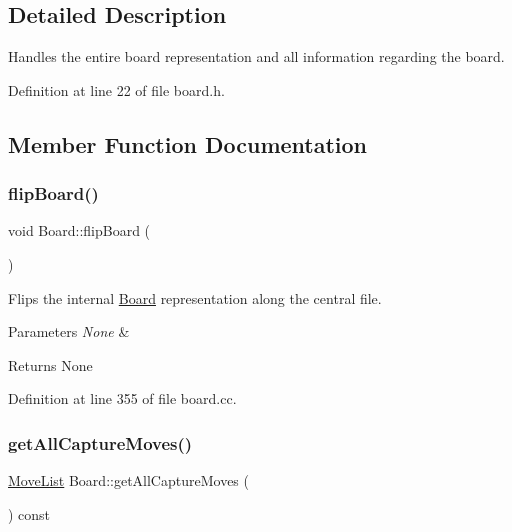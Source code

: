 \subsection{Detailed Description}
Handles the entire board representation and all information regarding the board. 

Definition at line 22 of file board.\+h.



\subsection{Member Function Documentation}
\mbox{\label{classBoard_a6007b1cc2025e26a23e63621f36fee19}} 
\subsubsection{\texorpdfstring{flip\+Board()}{flipBoard()}}
{\footnotesize\ttfamily void Board\+::flip\+Board (\begin{DoxyParamCaption}{ }\end{DoxyParamCaption})\hspace{0.3cm}{\ttfamily [noexcept]}}



Flips the internal \mbox{\hyperlink{classBoard}{Board}} representation along the central file. 


\begin{DoxyParams}{Parameters}
{\em None} & \\
\hline
\end{DoxyParams}
\begin{DoxyReturn}{Returns}
None 
\end{DoxyReturn}


Definition at line 355 of file board.\+cc.

\mbox{\label{classBoard_a884b9114fd749aeec4359fac01eb1db1}} 
\subsubsection{\texorpdfstring{get\+All\+Capture\+Moves()}{getAllCaptureMoves()}}
{\footnotesize\ttfamily \mbox{\hyperlink{classMoveList}{Move\+List}} Board\+::get\+All\+Capture\+Moves (\begin{DoxyParamCaption}{ }\end{DoxyParamCaption}) const\hspace{0.3cm}{\ttfamily [noexcept]}}



